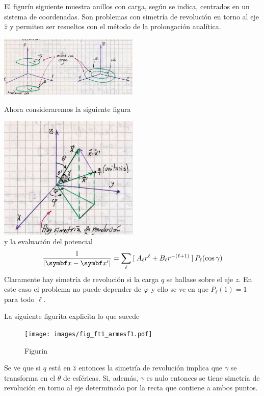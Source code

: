 \documentclass[10pt,oneside]{CBFT_book}
\begin{document}
El figurín siguiente muestra anillos con carga, según se indica, centrados en un sistema de
coordenadas. Son problemas con simetría de revolución en torno al eje $\hat{z}$ y permiten ser
resueltos con el método de la prolongación analítica.

\includegraphics[width=0.5\textwidth]{images/fig_ft1_eje_proble_prolonga.jpg}

Ahora consideraremos la siguiente figura

\includegraphics[width=0.5\textwidth]{images/fig_ft1_ejez_separacionEsfericas.jpg}
\\
y la evaluación del potencial 
\[
	\frac{1}{|\vbx - \vbx'|} = \sum_{\ell} \: 
	[ \: A_\ell r^\ell + B_\ell r^{-(\ell +1 )} \: ] \: P_\ell ( \cos \gamma )
\]
Claramente hay simetría de revolución si la carga $q$ se hallase sobre el eje $z$. 
En este caso el problema no puede depender de $\varphi$ y ello se ve en que 
$P_\ell ( 1 ) = 1$ para todo $\ell$.

La siguiente figurita explicita lo que sucede
\begin{figure}[bht]
	\begin{center}
	\texttt{[image: images/fig\_ft1\_armesf1.pdf]}	 
	\end{center}
	\caption{Figurin}
\end{figure}

Se ve que si $q$ está en $\hat{z}$ entonces la simetría de revolución implica que
$\gamma $ se transforma en el $\theta$ de esféricas.  
Si, además,  $\gamma $ es nulo entonces se tiene simetría de revolución en
torno al eje determinado por la recta que contiene a ambos puntos.
\end{document}
